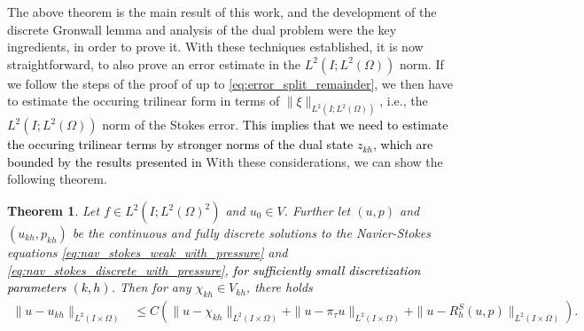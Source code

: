\documentclass{m2an}
\newcommand\blue[1]{\textcolor{black}{#1}}
\newtheorem{theorem}{Theorem}[section]
\newcommand{\Vkh}{V_{kh}}
\newcommand{\ukh}{u_{kh}}
\newcommand{\zkh}{z_{kh}}
\newcommand{\pkh}{p_{kh}}
\begin{document}
The above theorem is the main result of this work, and the development of the discrete Gronwall 
lemma and analysis of the dual problem were the key ingredients, in order to prove it.
With these techniques established, it is now straightforward, to also prove an 
error estimate in the $L^2(I;L^2(\Omega))$ norm.
If we follow the steps of the proof of  up to \eqref{eq:error_split_remainder},
we then have to estimate the occuring trilinear form in terms of $\|\xi\|_{L^2(I;L^2(\Omega))}$, 
i.e., the $L^2(I;L^2(\Omega))$ norm of the Stokes error.
\blue{This implies that we need to estimate the occuring trilinear terms by stronger norms of
the dual state $\zkh$, which are bounded by the results presented in \Cref{lemm:discrete_dual_h2}}
With these considerations, we can show the following theorem.
\begin{theorem}\label{thm:nav_stokes_l2l2}
  Let $f \in L^2(I;L^2(\Omega)^2)$ and $u_0 \in V$. Further let $(u,p)$ and $(\ukh,\pkh)$ be the continuous
  and fully discrete solutions to the Navier-Stokes equations \eqref{eq:nav_stokes_weak_with_pressure}
  and \eqref{eq:nav_stokes_discrete_with_pressure},
  \blue{for sufficiently small discretization parameters $(k,h)$.}
  Then for any $\chi_{kh} \in \Vkh$, there holds
   \begin{align*}
     \|u-\ukh\|_{L^2(I\times \Omega)} & \le C \left(\| u - \chi_{kh}\|_{L^2(I\times\Omega)} 
     + \|u - \pi_\tau u\|_{L^2(I\times \Omega)} + \|u - R_h^S(u,p)\|_{L^2(I\times \Omega)}\right).
   \end{align*}
\end{theorem}
\end{document}
